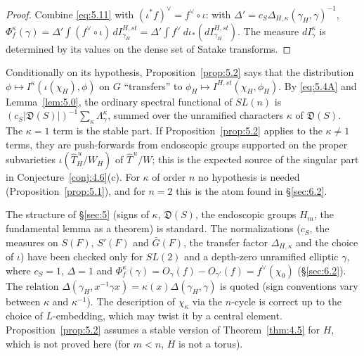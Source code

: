 \documentclass[12pt,letterpaper]{article}
\numberwithin{equation}{section}
\theoremstyle{plain}
\theoremstyle{remark}
\theoremstyle{plain}
\theoremstyle{definition}
\theoremstyle{remark}
\theoremstyle{remark}
\newcommand{\Thu}{\widehat{T}^{\,u}}
\begin{document}
\begin{proof}
Combine \eqref{eq:5.11} with $(\iota^*f)^\vee=f^\vee\circ\iota$: with $\Delta'=c_S\Delta_{H,\kappa}(\gamma_H,\gamma)^{-1}$, $\Phi^\kappa_f(\gamma)=\Delta'\int(f^\vee\circ\iota)\,dI^{H,st}_{\gamma_H}=\Delta'\int f^\vee\,d\iota_*(dI^{H,st}_{\gamma_H})$. The measure $dI^\kappa_\gamma$ is determined by its values on the dense set of Satake transforms.
\end{proof}

Conditionally on its hypothesis, Proposition~\ref{prop:5.2} says that the distribution $\phi\mapsto I^\kappa(\iota(\chi_H),\phi)$ on $G$ ``transfers'' to $\phi_H\mapsto I^{H,st}(\chi_H,\phi_H)$. By \eqref{eq:5.4A} and Lemma~\ref{lem:5.0}, the ordinary spectral functional of $SL(n)$ is $(c_S|\mathfrak D(S)|)^{-1}\sum_\kappa\Lambda^\kappa_\gamma$, summed over the unramified characters $\kappa$ of $\mathfrak D(S)$. The $\kappa=1$ term is the stable part. If Proposition~\ref{prop:5.2} applies to the $\kappa\ne1$ terms, they are push-forwards from endoscopic groups supported on the proper subvarieties $\iota(\Thu_H/W_H)$ of $\Thu/W$; this is the expected source of the singular part in Conjecture~\ref{conj:4.6}(c). For $\kappa$ of order $n$ no hypothesis is needed (Proposition~\ref{prop:5.1}), and for $n=2$ this is the atom found in \S\ref{sec:6.2}.

\begin{rem26}[\S\ref{sec:5}]\label{r:S5}
The structure of \S\ref{sec:5} (signs of $\kappa$, $\mathfrak D(S)$, the endoscopic groups $H_m$, the fundamental lemma as a theorem) is standard. The normalizations ($c_S$, the measures on $S(F)$, $S'(F)$ and $\bar G(F)$, the transfer factor $\Delta_{H,\kappa}$ and the choice of $\iota$) have been checked only for $SL(2)$ and a depth-zero unramified elliptic $\gamma$, where $c_S=1$, $\Delta=1$ and $\Phi^\kappa_f(\gamma)=O_\gamma(f)-O_{\gamma'}(f)=f^\vee(\chi_0)$ (\S\ref{sec:6.2}). The relation $\Delta(\gamma_H,x^{-1}\gamma x)=\kappa(x)\Delta(\gamma_H,\gamma)$ is quoted (sign conventions vary between $\kappa$ and $\kappa^{-1}$). The description of $\chi_\kappa$ via the $n$-cycle is correct up to the choice of $L$-embedding, which may twist it by a central element. Proposition~\ref{prop:5.2} assumes a stable version of Theorem~\ref{thm:4.5} for $H$, which is not proved here (for $m<n$, $H$ is not a torus).
\end{rem26}
\end{document}
